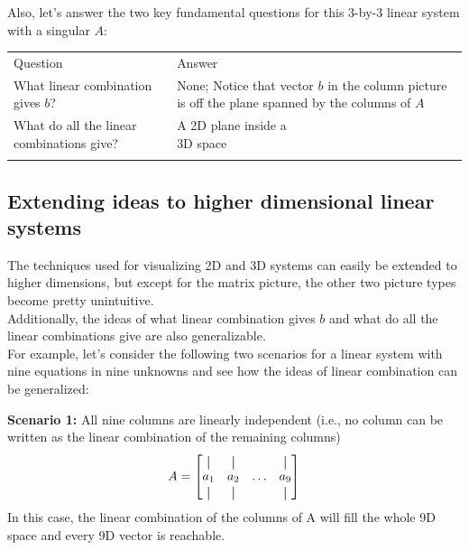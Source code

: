 \documentclass[../main.tex]{subfiles}
\begin{document}
Also, let's answer the two key fundamental questions for this 3-by-3 linear system with a singular $A$:

\begin{tabular}{@{}ll@{}} \trule
    \textrm{Question}                         & \textrm{Answer}                                   \\ \mrule
    What linear combination gives $b$?        & \makecell[tl]{None; Notice that vector $b$ in the \\ column picture is off the plane \\ spanned by the columns of  $A$} \\
    What do all the linear combinations give? & \makecell[tl]{A 2D plane inside a                 \\ 3D space} \\ \brule
\end{tabular}

\subsection{Extending ideas to higher dimensional linear systems}
The techniques used for visualizing 2D and 3D systems can easily be extended to higher dimensions, but except for the matrix picture, the other two picture types become pretty unintuitive. \\

Additionally, the ideas of what linear combination gives $b$ and what do all the linear combinations give are also generalizable. \\

For example, let's consider the following two scenarios for a linear system with nine equations in nine unknowns and see how the ideas of linear combination can be generalized:

\textbf{Scenario 1:} All nine columns are linearly independent
(i.e., no column can be written as the linear combination of the remaining columns)
\[
    A
    =
    \begin{bmatrix}
        \vertbar & \vertbar &        & \vertbar \\
        a_{1}    & a_{2}    & \ldots & a_{9}    \\
        \vertbar & \vertbar &        & \vertbar \\
    \end{bmatrix}
\]
In this case, the linear combination of the columns of A will fill the whole 9D space and every 9D vector is reachable.
\end{document}
